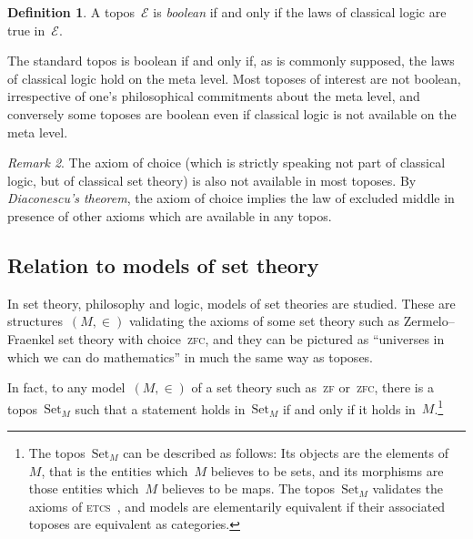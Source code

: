 \documentclass[oneside]{amsart}
\theoremstyle{definition}
\newtheorem{defn}{Definition}[section]
\theoremstyle{plain}
\theoremstyle{remark}
\newtheorem{rem}[defn]{Remark}
\newcommand{\E}{\mathcal{E}}
\newcommand{\Set}{\mathrm{Set}}
\renewcommand{\_}{\mathpunct{.}\,}
\newcommand{\?}{\,{:}\,}
\begin{document}
\begin{defn}A topos~$\E$ is \emph{boolean} if and only if the laws of classical
logic are true in~$\E$.\end{defn}

The standard topos is boolean if and only if, as is commonly supposed, the laws
of classical logic hold on the meta level. Most toposes of interest are not
boolean, irrespective of one's philosophical commitments about the meta level,
and conversely some toposes are boolean even if classical logic is not
available on the meta level.

\begin{rem}The axiom of choice (which is strictly speaking not part of
classical logic, but of classical set theory) is also not available in most
toposes. By \emph{Diaconescu's theorem}, the axiom of choice implies the law of
excluded middle in presence of other axioms which are available in any topos.
\end{rem}




\subsection{Relation to models of set theory} In set theory, philosophy and
logic, models of set theories are studied. These are structures~$(M,\in)$
validating the axioms of some set theory such as Zermelo--Fraenkel set theory
with choice~\textsc{zfc}, and they can be pictured as ``universes in which we
can do mathematics'' in much the same way as toposes.

In fact, to any model~$(M,\in)$ of a set theory such as~\textsc{zf}
or~\textsc{zfc}, there is a topos~$\Set_M$ such that a statement holds
in~$\Set_M$ if and only if it holds in~$M$.\footnote{The topos~$\Set_M$ can be
described as follows: Its objects are the elements of~$M$, that is the entities
which~$M$ believes to be sets, and its morphisms are those entities which~$M$
believes to be maps. The topos~$\Set_M$ validates the axioms of
\textsc{etcs}~\cite{XXX}, and models are elementarily equivalent if their
associated toposes are equivalent as categories.}
\end{document}
